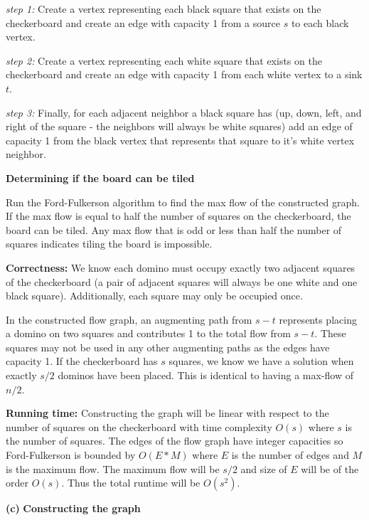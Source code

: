 \documentclass[11pt]{article}
\renewcommand\part[1]{\vspace{.10in}\textbf{(#1)}}
\newcommand\correctness{\vspace{.10in}\textbf{Correctness: }}
\newcommand\runtime{\vspace{.10in}\textbf{Running time: }}
\begin{document}
\textit{step 1:} Create a vertex representing each black square that exists on the checkerboard and create an edge with capacity 1 from a source $s$ to each black vertex.

\textit{step 2:} Create a vertex representing each white square that exists on the checkerboard and create an edge with capacity 1 from each white vertex to a sink $t$.

\textit{step 3:} Finally, for each adjacent neighbor a black square has (up, down, left, and right of the square - the neighbors will always be white squares) add an edge of capacity 1 from the black vertex that represents that square to it's white vertex neighbor.

\textbf{Determining if the board can be tiled} 

Run the Ford-Fulkerson algorithm to find the max flow of the constructed graph. If the max flow is equal to half the number of squares on the checkerboard, the board can be tiled. Any max flow that is odd or less than half the number of squares indicates tiling the board is impossible.

\correctness We know each domino must occupy exactly two adjacent squares of the checkerboard (a pair of adjacent squares will always be one white and one black square). Additionally, each square may only be occupied once.

	In the constructed flow graph, an augmenting path from $s-t$ represents placing a domino on two squares and contributes 1 to the total flow from $s-t$. These squares may not be used in any other augmenting paths as the edges have capacity 1. If the checkerboard has $s$ squares, we know we have a solution when exactly $s/2$ dominos have been placed. This is identical to having a max-flow of $n/2$.

\runtime Constructing the graph will be linear with respect to the number of squares on the checkerboard with time complexity $O(s)$ where $s$ is the number of squares. The edges of the flow graph have integer capacities so Ford-Fulkerson is bounded by $O(E * M)$ where $E$ is the number of edges and $M$ is the maximum flow. The maximum flow will be $s/2$ and size of $E$ will be of the order $O(s)$. Thus the total runtime will be $O(s^2)$.


\part{c} \textbf{Constructing the graph} 
\end{document}
